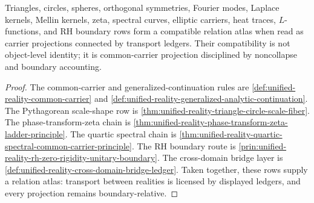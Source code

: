 \begin{theorem}
\label{thm:unified-reality-relation-atlas-principle}
Triangles, circles, spheres, orthogonal symmetries, Fourier modes,
Laplace kernels, Mellin kernels, zeta, spectral curves, elliptic
carriers, heat traces, $L$-functions, and RH boundary rows form a
compatible relation atlas when read as carrier projections connected by
transport ledgers. Their compatibility is not object-level identity; it
is common-carrier projection disciplined by noncollapse and boundary
accounting.
\end{theorem}

\begin{proof}
The common-carrier and generalized-continuation rules are
\autoref{def:unified-reality-common-carrier} and
\autoref{def:unified-reality-generalized-analytic-continuation}. The
Pythagorean scale-shape row is
\autoref{thm:unified-reality-triangle-circle-scale-fiber}. The
phase-transform-zeta chain is
\autoref{thm:unified-reality-phase-transform-zeta-ladder-principle}. The
quartic spectral chain is
\autoref{thm:unified-reality-quartic-spectral-common-carrier-principle}.
The RH boundary route is
\autoref{prin:unified-reality-rh-zero-rigidity-unitary-boundary}. The
cross-domain bridge layer is
\autoref{def:unified-reality-cross-domain-bridge-ledger}. Taken
together, these rows supply a relation atlas: transport between
realities is licensed by displayed ledgers, and every projection remains
boundary-relative.
\end{proof}
